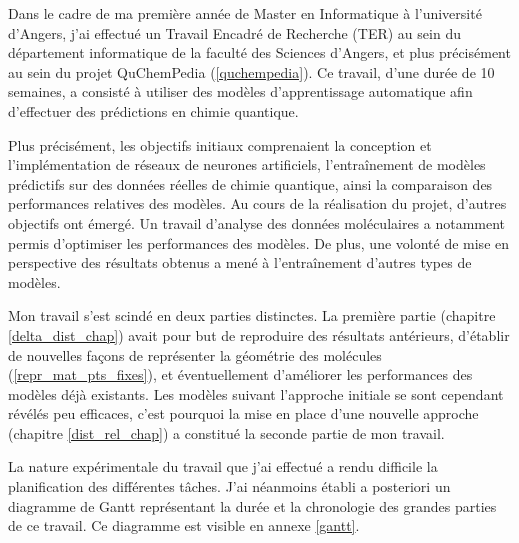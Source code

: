 
\par Dans le cadre de ma première année de Master en Informatique à l'université d'Angers, j'ai effectué un Travail Encadré de Recherche (TER) au sein du département informatique de la faculté des Sciences d'Angers, et plus précisément au sein du projet QuChemPedia (\ref{quchempedia}). Ce travail, d’une durée de 10 semaines, a consisté à utiliser des modèles d'apprentissage automatique afin d'effectuer des prédictions en chimie quantique.\\

\par Plus précisément, les objectifs initiaux comprenaient la conception et l'implémentation de réseaux de neurones artificiels, l'entraînement de modèles prédictifs sur des données réelles de chimie quantique, ainsi la comparaison des performances relatives des modèles. Au cours de la réalisation du projet, d'autres objectifs ont émergé. Un travail d'analyse des données moléculaires a notamment permis d'optimiser les performances des modèles. De plus, une volonté de mise en perspective des résultats obtenus a mené à l'entraînement d'autres types de modèles.\\

\par Mon travail s'est scindé en deux parties distinctes. La première partie (chapitre \ref{delta_dist_chap}) avait pour but de reproduire des résultats antérieurs, d'établir de nouvelles façons de représenter la géométrie des molécules (\ref{repr_mat_pts_fixes}), et éventuellement d'améliorer les performances des modèles déjà existants. Les modèles suivant l'approche initiale se sont cependant révélés peu efficaces, c'est pourquoi la mise en place d'une nouvelle approche (chapitre \ref{dist_rel_chap}) a constitué la seconde partie de mon travail.\\

\par La nature expérimentale du travail que j'ai effectué a rendu difficile la planification des différentes tâches. J'ai néanmoins établi a posteriori un diagramme de Gantt représentant la durée et la chronologie des grandes parties de ce travail. Ce diagramme est visible en annexe \ref{gantt}.
